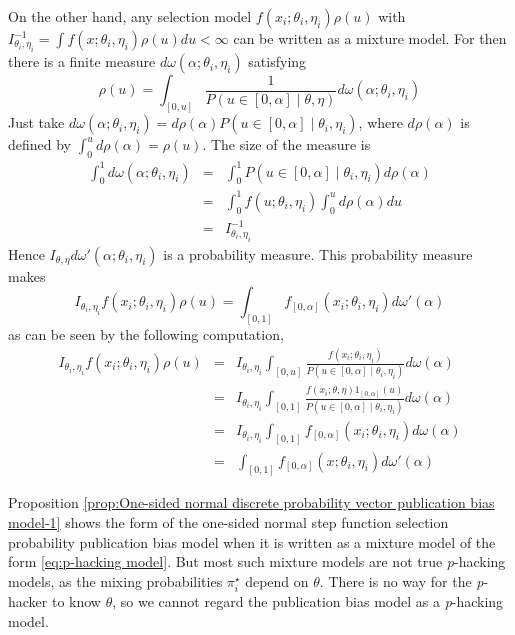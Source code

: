 \documentclass[preprint, authoryear]{elsarticle}
\theoremstyle{plain}
\theoremstyle{definition}
\begin{document}
On the other hand, any selection model $f\left(x_{i};\theta_{i},\eta_{i}\right)\rho\left(u\right)$ with $I_{\theta_{i},\eta_{i}}^{-1}=\int f\left(x;\theta_{i},\eta_{i}\right)\rho\left(u\right)du<\infty$ can be written as a mixture model. For then there is a finite measure $d\omega\left(\alpha;\theta_{i},\eta_{i}\right)$ satisfying 
\[
\rho\left(u\right)=\int_{[0,u]}\frac{1}{P\left(u\in\left[0,\alpha\right]\mid\theta,\eta\right)}d\omega\left(\alpha;\theta_{i},\eta_{i}\right)
\]
Just take $d\omega\left(\alpha;\theta_{i},\eta_{i}\right)=d\rho\left(\alpha\right)P\left(u\in\left[0,\alpha\right]\mid\theta_{i},\eta_{i}\right)$, where $d\rho\left(\alpha\right)$ is defined by $\int_{0}^{u}d\rho\left(\alpha\right)=\rho\left(u\right)$. The size of the measure is
\begin{eqnarray*}
\int_{0}^{1}d\omega\left(\alpha;\theta_{i},\eta_{i}\right) & = & \int_{0}^{1}P\left(u\in\left[0,\alpha\right]\mid\theta_{i},\eta_{i}\right)d\rho\left(\alpha\right)\\
 & = & \int_{0}^{1}f\left(u;\theta_{i},\eta_{i}\right)\int_{0}^{u}d\rho\left(\alpha\right)du\\
 & = & I_{\theta_{i},\eta_{i}}^{-1}
\end{eqnarray*}
Hence $I_{\theta,\eta}d\omega'\left(\alpha;\theta_{i},\eta_{i}\right)$ is a probability measure. This probability measure makes 
\[
I_{\theta_{i},\eta_{i}}f\left(x_{i};\theta_{i},\eta_{i}\right)\rho\left(u\right)=\int_{[0,1]}f_{\left[0,\alpha\right]}\left(x_{i};\theta_{i},\eta_{i}\right)d\omega'\left(\alpha\right)
\]
as can be seen by the following computation,
\begin{eqnarray*}
I_{\theta_{i},\eta_{i}}f\left(x_{i};\theta_{i},\eta_{i}\right)\rho\left(u\right) & = & I_{\theta_{i},\eta_{i}}\int_{[0,u]}\frac{f\left(x_{i};\theta_{i},\eta_{i}\right)}{P\left(u\in\left[0,\alpha\right]\mid\theta_{i},\eta_{i}\right)}d\omega\left(\alpha\right)\\
 & = & I_{\theta_{i},\eta_{i}}\int_{[0,1]}\frac{f\left(x_{i};\theta,\eta\right)1_{\left[0,\alpha\right]}\left(u\right)}{P\left(u\in\left[0,\alpha\right]\mid\theta_{i},\eta_{i}\right)}d\omega\left(\alpha\right)\\
 & = & I_{\theta_{i},\eta_{i}}\int_{[0,1]}f_{\left[0,\alpha\right]}\left(x_{i};\theta_{i},\eta_{i}\right)d\omega\left(\alpha\right)\\
 & = & \int_{[0,1]}f_{\left[0,\alpha\right]}\left(x;\theta_{i},\eta_{i}\right)d\omega'\left(\alpha\right)
\end{eqnarray*}

Proposition \ref{prop:One-sided normal discrete probability vector publication bias model-1} shows the form of the one-sided normal step function selection probability publication bias model when it is written as a mixture model of the form \eqref{eq:p-hacking model}. But most such mixture models are not true \emph{p}-hacking models, as the mixing probabilities $\pi_{i}^{\star}$ depend on $\theta$. There is no way for the \emph{p}-hacker to know
$\theta$, so we cannot regard the publication bias model as a \emph{p}-hacking model.





\label{lastpage}
\end{document}
